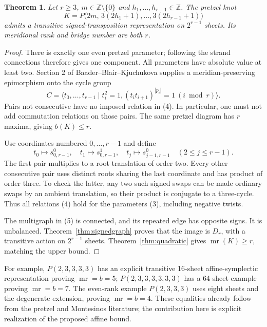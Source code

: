 \documentclass[11pt]{article}
\newtheorem{theorem}{Theorem}
\newcommand{\mr}{\operatorname{mr}}
\begin{document}
\begin{theorem}\label{thm:pretzel}
Let $r\ge3$, $m\in\mathbb Z\setminus\{0\}$ and
$h_1,\ldots,h_{r-1}\in\mathbb Z$. The pretzel knot
\[
 K=P\bigl(2m,\,3(2h_1+1),\ldots,3(2h_{r-1}+1)\bigr)    \tag{3}
\]
admits a transitive signed-transposition representation on $2^{r-1}$
sheets. Its meridional rank and bridge number are both $r$.
\end{theorem}
\begin{proof}
There is exactly one even pretzel parameter; following the strand
connections therefore gives one component. All parameters have absolute
value at least two. Section 2 of Baader--Blair--Kjuchukova
\cite{bbk} supplies a meridian-preserving epimorphism onto the cycle group
\[
 C=\langle t_0,\ldots,t_{r-1}\mid t_i^2=1,
       (t_it_{i+1})^{|p_i|}=1\ (i\bmod r)\rangle.       \tag{4}
\]
Pairs not consecutive have no imposed relation in (4).
In particular, one must not add commutation relations on those pairs.
The same pretzel diagram has $r$ maxima, giving $b(K)\le r$.

Use coordinates numbered $0,\ldots,r-1$ and define
\[
 t_0\longmapsto s_{0,r-1}^0,\quad
 t_1\longmapsto s_{0,r-1}^1,\quad
 t_j\longmapsto s_{j-1,r-1}^0\quad(2\le j\le r-1).
                                                               \tag{5}
\]
The first pair multiplies to a root translation of order two. Every other
consecutive pair uses distinct roots sharing the last coordinate and
has product of order three. To check the latter, any two such signed
swaps can be made ordinary swaps by an ambient translation, so their
product is conjugate to a three-cycle. Thus all relations (4) hold for
the parameters (3), including negative twists.

The multigraph in (5) is connected, and its repeated edge has opposite
signs. It is unbalanced. Theorem~\ref{thm:signedgraph} proves that the
image is $D_r$, with a transitive action on $2^{r-1}$ sheets.
Theorem~\ref{thm:quadratic} gives $\mr(K)\ge r$, matching the upper bound.
\end{proof}

For example, $P(2,3,3,3,3)$ has an explicit transitive 16-sheet
affine-symplectic representation proving $\mr=b=5$;
$P(2,3,3,3,3,3,3)$ has a 64-sheet example proving $\mr=b=7$.
The even-rank example $P(2,3,3,3)$ uses eight sheets and the degenerate
extension, proving $\mr=b=4$.
These equalities already follow from the pretzel and Montesinos literature;
the contribution here is explicit realization of the proposed affine bound.
\end{document}
